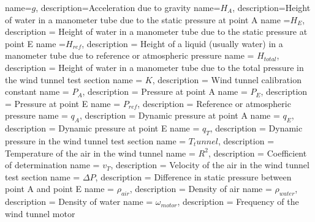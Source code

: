 {
    name=$g$,
    description={Acceleration due to gravity}
}
{
    name=$H_A$,
    description={Height of water in a manometer tube due to the static pressure at point A}
}
{
    name =$H_E$,
    description = {Height of water in a manometer tube due to the static pressure at point E}
}
{
    name =$H_{ref}$,
    description = {Height of a liquid (usually water) in a manometer tube due to reference or atmospheric pressure}
}
{
    name = $H_{total}$,
    description = {Height of water in a manometer tube due to the total pressure in the wind tunnel test section}
}
{
    name = $K$,
    description = {Wind tunnel calibration constant}
}
{
    name = $P_A$,
    description = {Pressure at point A}
}
{
    name = $P_E$,
    description = {Pressure at point E}
}
{
    name = $P_{ref}$,
    description = {Reference or atmospheric pressure}
}
{
    name = $q_A$,
    description = {Dynamic pressure at point A}
}
{
    name = $q_E$,
    description = {Dynamic pressure at point E}
}
{
    name = $q_T$,
    description = {Dynamic pressure in the wind tunnel test section}
}
{
    name = $T_tunnel$,
    description = {Temperature of the air in the wind tunnel}
}
{
    name = $R^2$,
    description = {Coefficient of determination}
}
{
    name = $v_T$,
    description = {Velocity of the air in the wind tunnel test section}
}
{
    name = $\Delta{}P$,
    description = {Difference in static pressure between point A and point E}
}
{
    name = $\rho_{air}$,
    description = {Density of air}
}
{
    name = $\rho_{water}$,
    description = {Density of water}
}
{
    name = $\omega_{motor}$,
    description = {Frequency of the wind tunnel motor}
}
